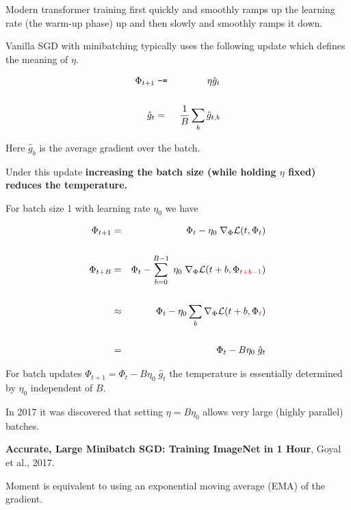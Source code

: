 {\vfill
Modern transformer training first quickly and smoothly ramps up the learning rate (the warm-up phase) up and then slowly and smoothly ramps it down.


Vanilla SGD with minibatching typically uses the following update which defines the meaning of $\eta$.

\begin{eqnarray*}
\Phi_{t+1} & \;\mbox{\tt -=}\; & \eta \hat{g}_t \\
\\
\hat{g}_t & = & \frac{1}{B} \sum_b \hat{g}_{t,b}
\end{eqnarray*}

\vfill
Here $\hat{g}_{b}$ is the average gradient over the batch.

\vfill
Under this update {\bf increasing the batch size (while holding $\eta$ fixed) reduces the temperature.}


For batch size 1 with learning rate $\eta_0$ we have

\begin{eqnarray*}
\Phi_{t+1} & = &  \Phi_{t} - \eta_0\;\nabla_\Phi {\cal L}(t,\Phi_{t}) \\
\\
\Phi_{t+B} & = &  \Phi_{t} - \sum_{b=0}^{B-1} \;\eta_0\;\nabla_\Phi {\cal L}(t+b,\Phi_{\color{red} t+b-1}) \\
\\
& \approx & \Phi_t - \eta_0 \sum_b \nabla_\Phi {\cal L}(t+b,\Phi_{\color{red} t}) \\
\\
& = & \Phi_t - B\eta_0\; \hat{g}_t
\end{eqnarray*}

\vfill
For batch updates $\Phi_{t+1} = \Phi_t - B\eta_0\; \hat{g}_t$ the temperature is essentially determined by $\eta_0$ independent of $B$.


In 2017 it was discovered that setting $\eta = B\eta_0$ allows very large (highly parallel)
batches.

\vfill
{\bf Accurate, Large Minibatch SGD: Training ImageNet in 1 Hour}, Goyal et al., 2017.




Moment is equivalent to using an exponential moving average (EMA) of the gradient.

}
